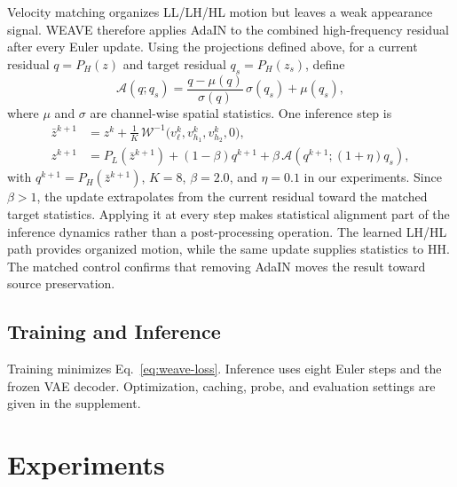 \documentclass[letterpaper]{article}
\begin{document}
Velocity matching organizes LL/LH/HL motion but leaves a weak appearance signal. WEAVE
therefore applies AdaIN to the combined high-frequency residual after every Euler
update. Using the projections defined above, for a current residual
$q=P_H(z)$ and target residual $q_s=P_H(z_s)$, define~\cite{huang2017arbitrary}
\begin{equation}
\mathcal A(q;q_s)=
\frac{q-\mu(q)}{\sigma(q)}\,\sigma(q_s)+\mu(q_s),
\label{eq:spatial-fiber-adain}
\end{equation}
where $\mu$ and $\sigma$ are channel-wise spatial statistics. One inference step is
\begin{equation}
\begin{aligned}
\bar z^{k+1}&=z^k+\frac{1}{K}\,\mathcal W^{-1}
\big(v_\ell^k,v_{h_1}^k,v_{h_2}^k,0\big),\\
z^{k+1}&=P_L(\bar z^{k+1})+(1-\beta)q^{k+1}
+\beta\,\mathcal A(q^{k+1};(1+\eta)q_s),
\end{aligned}
\label{eq:stepwise-alignment}
\end{equation}
with $q^{k+1}=P_H(\bar z^{k+1})$, $K=8$, $\beta=2.0$, and $\eta=0.1$ in our experiments.
Since $\beta>1$, the update extrapolates from the current residual toward the
matched target statistics. Applying it at every step makes statistical alignment part of
the inference dynamics rather than a post-processing operation. The learned LH/HL path
provides organized motion, while the same update supplies statistics to HH. The matched
control confirms that removing AdaIN moves the result toward source preservation.


\subsection{Training and Inference}

Training minimizes Eq.~\ref{eq:weave-loss}. Inference uses eight Euler steps and the frozen
VAE decoder. Optimization, caching, probe, and evaluation settings are given in the
supplement.



\section{Experiments}
\label{sec:exp}
\end{document}
